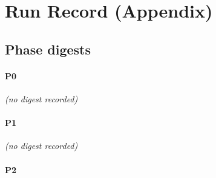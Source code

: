 \documentclass[11pt,a4paper]{article}
\begin{document}
\section{Run Record (Appendix)}
\subsection*{Phase digests}
\paragraph*{P0}
\emph{(no digest recorded)}
\paragraph*{P1}
\emph{(no digest recorded)}
\paragraph*{P2}
\end{document}
